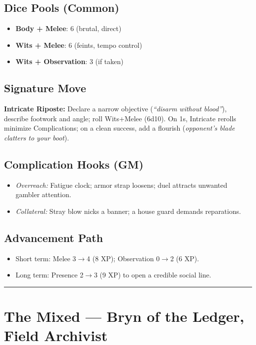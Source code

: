 \documentclass[12pt]{book}
\begin{document}
\subsection*{Dice Pools (Common)}
\begin{itemize}
  \item \textbf{Body + Melee}: 6 (brutal, direct)
  \item \textbf{Wits + Melee}: 6 (feints, tempo control)
  \item \textbf{Wits + Observation}: 3 (if taken)
\end{itemize}

\subsection*{Signature Move}
\textbf{Intricate Riposte:} Declare a narrow objective (\emph{``disarm without blood''}), describe footwork and angle; roll Wits+Melee (6d10). On 1s, Intricate rerolls minimize Complications; on a clean success, add a flourish (\emph{opponent’s blade clatters to your boot}).

\subsection*{Complication Hooks (GM)}
\begin{itemize}
  \item \emph{Overreach:} Fatigue clock; armor strap loosens; duel attracts unwanted gambler attention.
  \item \emph{Collateral:} Stray blow nicks a banner; a house guard demands reparations.
\end{itemize}

\subsection*{Advancement Path}
\begin{itemize}
  \item Short term: Melee 3$\rightarrow$4 (8 XP); Observation 0$\rightarrow$2 (6 XP).
  \item Long term: Presence 2$\rightarrow$3 (9 XP) to open a credible social line.
\end{itemize}

\bigskip
\hrule
\bigskip

\section{The Mixed — Bryn of the Ledger, Field Archivist}
\end{document}
